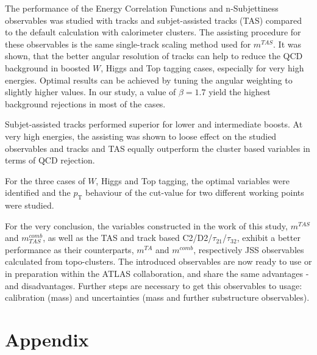 \documentclass[UKenglish,texlive=2013]{\ATLASLATEXPATH atlasdoc}
\newcommand{\mta}{m^{TA}}
\newcommand{\mtas}{m^{TAS}}
\newcommand{\mcomb}{m^{comb}}
\newcommand{\mcombtas}{m^{comb}_{TAS}}
\begin{document}
The performance of the Energy Correlation Functions and n-Subjettiness observables was studied with tracks and subjet-assisted tracks (TAS) compared to the default calculation with calorimeter clusters. The assisting procedure for these observables is the same single-track scaling method used for $\mtas$. It was shown, that the better angular resolution of tracks can help to reduce the QCD background in boosted $W$, Higgs and Top tagging cases, especially for very high energies. Optimal results can be achieved by tuning the angular weighting to slightly higher values. In our study, a value of $\beta=1.7$ yield the highest background rejections in most of the cases. 

Subjet-assisted tracks performed superior for lower and intermediate boosts. At very high energies, the assisting was shown to loose effect on the studied observables and tracks and TAS equally outperform the cluster based variables in terms of QCD rejection.

For the three cases of $W$, Higgs and Top tagging, the optimal variables were identified and the $p_{\text{T}}$ behaviour of the cut-value for two different working points were studied. 


For the very conclusion, the variables constructed in the work of this study, $\mtas$ and $\mcombtas$, as well as the TAS and track based C2/D2/$\tau_{21}$/$\tau_{32}$, exhibit a better performance as their counterparts, $\mta$ and $\mcomb$, respectively JSS observables calculated from topo-clusters. The introduced observables are now ready to use or in preparation within the ATLAS collaboration, and share the same advantages -and disadvantages. Further steps are necessary to get this observables to usage: calibration (mass) and uncertainties (mass and further substructure observables).

\clearpage
\appendix
\part*{Appendix}
\end{document}
